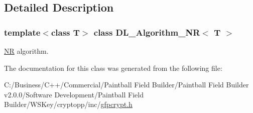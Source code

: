 \subsection{Detailed Description}
\subsubsection*{template$<$class T$>$ class DL\_\-Algorithm\_\-NR$<$ T $>$}

\hyperlink{struct_n_r}{NR} algorithm. 

The documentation for this class was generated from the following file:\begin{DoxyCompactItemize}
\item 
C:/Business/C++/Commercial/Paintball Field Builder/Paintball Field Builder v2.0.0/Software Development/Paintball Field Builder/WSKey/cryptopp/inc/\hyperlink{gfpcrypt_8h}{gfpcrypt.h}\end{DoxyCompactItemize}
